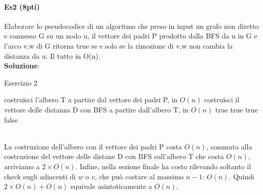 \paragraph{Es2 (8pti)}
Elaborare lo pseudocodice di un algoritmo che preso in input un grafo non diretto e connesso G su un nodo u, il vettore dei padri P prodotto dalla BFS da u in G e l'arco {v,w} di G ritorna true se e solo se la rimozione di {v,w} non cambia la distanza da u. Il tutto in O(n). \\
\textbf{Soluzione}:
\begin{algorithm}
	\caption{Esercizio 2}\label{alg:es2}
	\begin{algorithmic}[1]
			\State costruisci l'albero T a partire dal vettore dei padri P, in $O(n)$
			\State costruisci il vettore delle distanza D con BFS a partire dall'albero T, in $O(n)$
				\State \Return true
			\Else
							\State \Return true
						\EndIf
					\EndFor
							\State \Return true
						\EndIf
					\EndFor
				\EndIf
			\EndIf
			\State \Return false
		\EndFunction
	\end{algorithmic}
\end{algorithm} \\ \hfill
La costruzione dell'albero con il vettore dei padri P costa $O(n)$, sommata alla costruzione del vettore delle distane D con BFS sull'albero T che costa $O(n)$, arriviamo a $2 \times O(n)$. Infine, nella sezione finale ha costo rilevando soltanto il check sugli adiacenti di $w$ o $v$, che può costare al massimo $n-1$: $O(n)$. Quindi $2 	\times O(n) + O(n)$ equivale asintoticamente a $O(n)$.
\newpage

